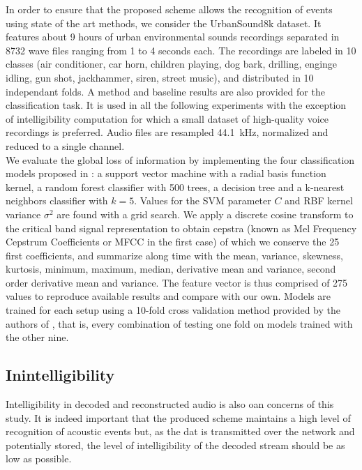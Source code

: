 \documentclass[final,3p,times,twocolumn]{elsarticle}
\begin{document}
In order to ensure that the proposed scheme allows the recognition of events using state of the art methods, we consider the UrbanSound8k dataset\cite{salamon2014}. It features about 9 hours of urban environmental sounds recordings separated in 8732 wave files ranging from 1 to 4 seconds each. The recordings are labeled in 10 classes (air conditioner, car horn, children playing, dog bark, drilling, enginge idling, gun shot, jackhammer, siren, street music), and distributed in 10 independant folds. A method and baseline results are also provided for the classification task. It is used in all the following experiments with the exception of intelligibility computation for which a small dataset of high-quality voice recordings is preferred. Audio files are resampled 44.1~kHz, normalized and reduced to a single channel.\\

We evaluate the global loss of information by implementing the four classification models proposed in \cite{salamon2014}: a support vector machine with a radial basis function kernel, a random forest classifier with 500 trees, a decision tree and a k-nearest neighbors classifier with $k = 5$. Values for the SVM parameter $C$ and RBF kernel variance $\sigma^2$ are found with a grid search. We apply a discrete cosine transform to the critical band signal representation to obtain cepstra (known as Mel Frequency Cepstrum Coefficients or MFCC in the first case) of which we conserve the 25 first coefficients, and summarize along time with the mean, variance, skewness, kurtosis, minimum, maximum, median, derivative mean and variance, second order derivative mean and variance. The feature vector is thus comprised of 275 values to reproduce available results and compare with our own. Models are trained for each setup using a 10-fold cross validation method provided by the authors of \cite{salamon2014}, that is, every combination of testing one fold on models trained with the other nine.

\subsection{Inintelligibility}

Intelligibility in decoded and reconstructed audio is also oan concerns of this study. It is indeed important that the produced scheme maintains a high level of recognition of acoustic events but, as the dat is transmitted over the network and potentially stored, the level of intelligibility of the decoded stream should be as low as possible.
\end{document}
